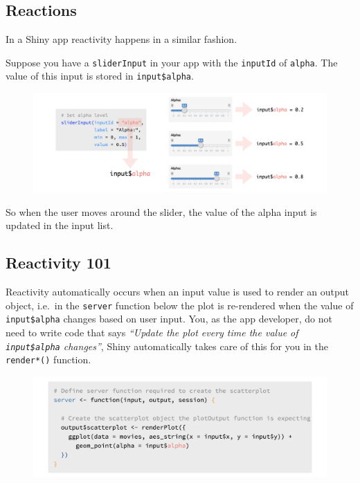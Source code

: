 \documentclass[
  letterpaper,
  DIV=11,
  numbers=noendperiod]{scrreprt}
\begin{document}
\hypertarget{reactions}{%
\subsection{Reactions}\label{reactions}}

In a Shiny app reactivity happens in a similar fashion.

Suppose you have a \texttt{sliderInput} in your app with the
\texttt{inputId} of \texttt{alpha}. The value of this input is stored in
\texttt{input\$alpha}.

\begin{figure}

{\centering \includegraphics[width=1\textwidth,height=\textheight]{./images/slider-alpha.png}

}

\end{figure}

So when the user moves around the slider, the value of the alpha input
is updated in the input list.

\hypertarget{reactivity-101}{%
\subsection{Reactivity 101}\label{reactivity-101}}

Reactivity automatically occurs when an input value is used to render an
output object, i.e.~in the \texttt{server} function below the plot is
re-rendered when the value of \texttt{input\$alpha} changes based on
user input. You, as the app developer, do not need to write code that
says \emph{``Update the plot every time the value of
\texttt{input\$alpha} changes''}, Shiny automatically takes care of this
for you in the \texttt{render*()} function.

\begin{figure}

{\centering \includegraphics[width=1\textwidth,height=\textheight]{./images/server-alpha.png}

}

\end{figure}
\end{document}
